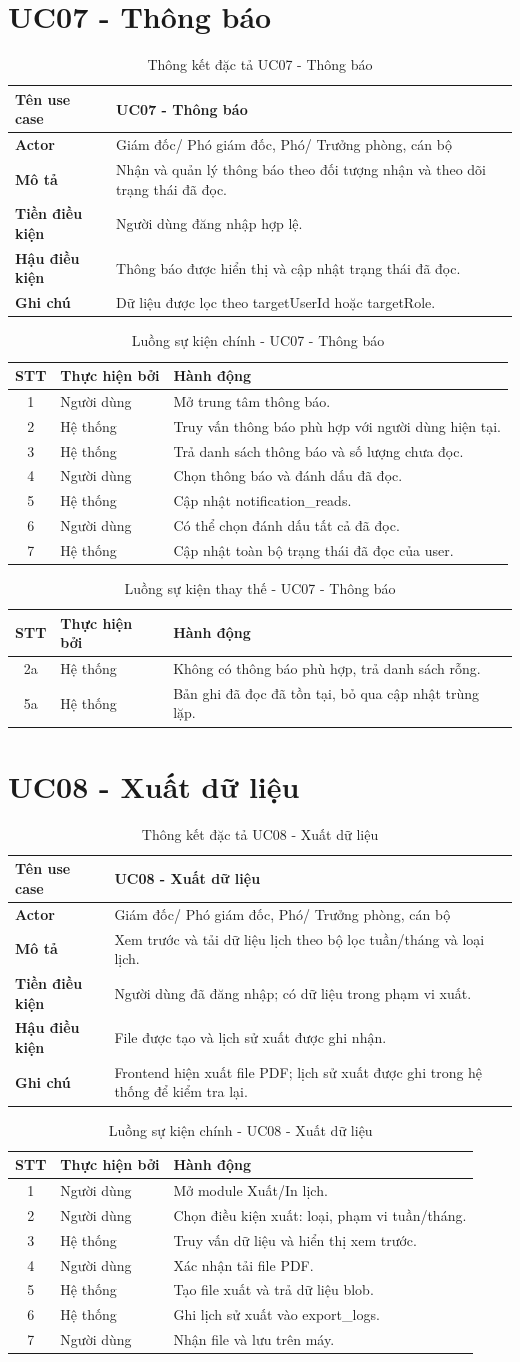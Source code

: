 \documentclass[18pt,a4paper]{report}
\newcommand{\specinfo}[6]{
\begin{table}[H]
\centering
\caption{Thông kết đặc tả #1}
\begin{tabularx}{\textwidth}{|>{\raggedright\arraybackslash}p{3.2cm}|X|}
\hline
\textbf{Tên use case} & #1 \\ \hline
\textbf{Actor} & #2 \\ \hline
\textbf{Mô tả} & #3 \\ \hline
\textbf{Tiền điều kiện} & #4 \\ \hline
\textbf{Hậu điều kiện} & #5 \\ \hline
\textbf{Ghi chú} & #6 \\ \hline
\end{tabularx}
\end{table}
}
\newcommand{\mainflowtable}[1]{
\begin{table}[H]
\centering
\caption{Luồng sự kiện chính - #1}
\begin{tabularx}{\textwidth}{|c|>{\raggedright\arraybackslash}p{3cm}|X|}
\hline
\textbf{STT} & \textbf{Thực hiện bởi} & \textbf{Hành động} \\ \hline
}
\newcommand{\altflowtable}[1]{
\begin{table}[H]
\centering
\caption{Luồng sự kiện thay thế - #1}
\begin{tabularx}{\textwidth}{|c|>{\raggedright\arraybackslash}p{3cm}|X|}
\hline
\textbf{STT} & \textbf{Thực hiện bởi} & \textbf{Hành động} \\ \hline
}
\begin{document}
\section{UC07 - Thông báo}
\specinfo
{UC07 - Thông báo}
{Giám đốc/ Phó giám đốc, Phó/ Trưởng phòng, cán bộ}
{Nhận và quản lý thông báo theo đối tượng nhận và theo dõi trạng thái đã đọc.}
{Người dùng đăng nhập hợp lệ.}
{Thông báo được hiển thị và cập nhật trạng thái đã đọc.}
{Dữ liệu được lọc theo targetUserId hoặc targetRole.}

\mainflowtable{UC07 - Thông báo}
1 & Người dùng & Mở trung tâm thông báo. \\ \hline
2 & Hệ thống & Truy vấn thông báo phù hợp với người dùng hiện tại. \\ \hline
3 & Hệ thống & Trả danh sách thông báo và số lượng chưa đọc. \\ \hline
4 & Người dùng & Chọn thông báo và đánh dấu đã đọc. \\ \hline
5 & Hệ thống & Cập nhật notification\_reads. \\ \hline
6 & Người dùng & Có thể chọn đánh dấu tất cả đã đọc. \\ \hline
7 & Hệ thống & Cập nhật toàn bộ trạng thái đã đọc của user. \\ \hline
\end{tabularx}
\end{table}

\altflowtable{UC07 - Thông báo}
2a & Hệ thống & Không có thông báo phù hợp, trả danh sách rỗng. \\ \hline
5a & Hệ thống & Bản ghi đã đọc đã tồn tại, bỏ qua cập nhật trùng lặp. \\ \hline
\end{tabularx}
\end{table}

\section{UC08 - Xuất dữ liệu}
\specinfo
{UC08 - Xuất dữ liệu}
{Giám đốc/ Phó giám đốc, Phó/ Trưởng phòng, cán bộ}
{Xem trước và tải dữ liệu lịch theo bộ lọc tuần/tháng và loại lịch.}
{Người dùng đã đăng nhập; có dữ liệu trong phạm vi xuất.}
{File được tạo và lịch sử xuất được ghi nhận.}
{Frontend hiện xuất file PDF; lịch sử xuất được ghi trong hệ thống để kiểm tra lại.}

\mainflowtable{UC08 - Xuất dữ liệu}
1 & Người dùng & Mở module Xuất/In lịch. \\ \hline
2 & Người dùng & Chọn điều kiện xuất: loại, phạm vi tuần/tháng. \\ \hline
3 & Hệ thống & Truy vấn dữ liệu và hiển thị xem trước. \\ \hline
4 & Người dùng & Xác nhận tải file PDF. \\ \hline
5 & Hệ thống & Tạo file xuất và trả dữ liệu blob. \\ \hline
6 & Hệ thống & Ghi lịch sử xuất vào export\_logs. \\ \hline
7 & Người dùng & Nhận file và lưu trên máy. \\ \hline
\end{tabularx}
\end{table}
\end{document}
